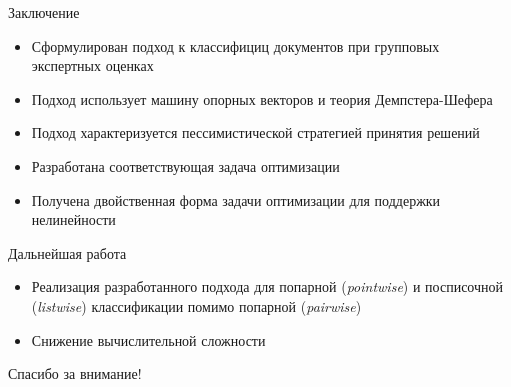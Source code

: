 \documentclass[11pt]{beamer}
\begin{document}
\begin{frame}{Заключение}

\begin{itemize}
	\item Сформулирован подход к классифициц документов при групповых экспертных оценках
	\item Подход использует машину опорных векторов и теория Демпстера-Шефера
	\item Подход характеризуется пессимистической стратегией принятия решений
	\item Разработана соответствующая задача оптимизации
	\item Получена двойственная форма задачи оптимизации для поддержки нелинейности
\end{itemize}

\end{frame}
\begin{frame}{Дальнейшая работа}

\begin{itemize}
	\item Реализация разработанного подхода для попарной (\textit{pointwise}) и посписочной (\textit{listwise}) классификации помимо попарной (\textit{pairwise})
	\item Снижение вычислительной сложности
\end{itemize}

\end{frame}
\begin{frame}

\begin{center}
{\Large Спасибо за внимание!}
\end{center}

\end{frame}
\end{document}
